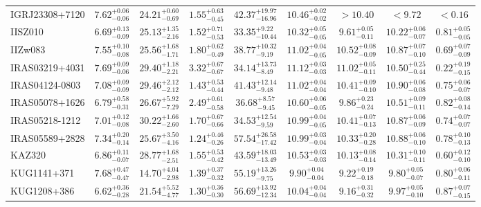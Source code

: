 \documentclass[onecolumn]{mn2e}
\begin{document}
{\begin{center}
\begin{longtable}{lcccccccc}
IGRJ23308+7120 & $7.62_{-0.06}^{+0.06}$ & $24.21_{-0.69}^{+0.60}$ & $1.55_{-0.45}^{+0.63}$ &$42.37_{-16.96}^{+19.97}$ & $10.46_{-0.02}^{+0.02}$ & $>10.40$ & $<9.72$ & $<0.16$ \\
IISZ010 & $6.69_{-0.09}^{+0.13}$ & $25.13_{-2.16}^{+1.35}$ & $1.52_{-0.53}^{+0.71}$ &$33.35_{-10.44}^{+9.22}$ & $10.32_{-0.05}^{+0.05}$ & $9.61_{-0.11}^{+0.05}$ & $10.22_{-0.07}^{+0.06}$ & $0.81_{-0.05}^{+0.05}$ \\
IIZw083 & $7.55_{-0.08}^{+0.10}$ & $25.56_{-1.71}^{+1.68}$ & $1.80_{-0.49}^{+0.62}$ &$38.77_{-9.19}^{+10.32}$ & $11.02_{-0.05}^{+0.04}$ & $10.52_{-0.09}^{+0.08}$ & $10.87_{-0.10}^{+0.07}$ & $0.69_{-0.09}^{+0.07}$ \\
IRAS03219+4031 & $7.69_{-0.06}^{+0.09}$ & $29.40_{-2.21}^{+1.18}$ & $3.32_{-0.67}^{+0.67}$ &$34.14_{-8.49}^{+13.73}$ & $11.12_{-0.03}^{+0.03}$ & $11.02_{-0.11}^{+0.05}$ & $10.50_{-0.44}^{+0.25}$ & $0.22_{-0.15}^{+0.19}$ \\
IRAS04124-0803 & $7.08_{-0.09}^{+0.09}$ & $29.46_{-2.12}^{+2.12}$ & $1.43_{-0.44}^{+0.53}$ &$41.43_{-9.48}^{+12.14}$ & $11.02_{-0.04}^{+0.04}$ & $10.41_{-0.10}^{+0.09}$ & $10.90_{-0.08}^{+0.06}$ & $0.75_{-0.07}^{+0.06}$ \\
IRAS05078+1626 & $6.79_{-0.31}^{+0.58}$ & $26.67_{-7.29}^{+5.92}$ & $2.49_{-0.58}^{+0.61}$ &$36.68_{-9.45}^{+8.57}$ & $10.60_{-0.05}^{+0.06}$ & $9.86_{-0.24}^{+0.23}$ & $10.51_{-0.11}^{+0.09}$ & $0.82_{-0.14}^{+0.08}$ \\
IRAS05218-1212 & $7.01_{-0.08}^{+0.12}$ & $30.22_{-2.60}^{+1.66}$ & $1.70_{-0.66}^{+0.67}$ &$34.53_{-9.59}^{+12.54}$ & $10.99_{-0.05}^{+0.04}$ & $10.41_{-0.13}^{+0.07}$ & $10.87_{-0.09}^{+0.06}$ & $0.74_{-0.07}^{+0.07}$ \\
IRAS05589+2828 & $7.34_{-0.14}^{+0.20}$ & $25.67_{-4.16}^{+3.50}$ & $1.24_{-0.26}^{+0.46}$ &$57.54_{-17.42}^{+26.58}$ & $10.99_{-0.04}^{+0.03}$ & $10.33_{-0.28}^{+0.20}$ & $10.88_{-0.10}^{+0.06}$ & $0.78_{-0.13}^{+0.10}$ \\
KAZ320 & $6.86_{-0.07}^{+0.11}$ & $28.77_{-2.51}^{+1.68}$ & $1.55_{-0.42}^{+0.53}$ &$43.59_{-13.49}^{+18.03}$ & $10.53_{-0.03}^{+0.03}$ & $10.13_{-0.14}^{+0.08}$ & $10.31_{-0.11}^{+0.10}$ & $0.60_{-0.10}^{+0.12}$ \\
KUG1141+371 & $7.68_{-0.47}^{+0.47}$ & $14.70_{-2.98}^{+4.04}$ & $1.39_{-0.32}^{+0.37}$ &$55.19_{-9.75}^{+13.26}$ & $9.90_{-0.04}^{+0.04}$ & $9.22_{-0.18}^{+0.19}$ & $9.80_{-0.07}^{+0.05}$ & $0.80_{-0.11}^{+0.06}$ \\
KUG1208+386 & $6.62_{-0.28}^{+0.36}$ & $21.54_{-4.77}^{+5.52}$ & $1.30_{-0.30}^{+0.36}$ &$56.69_{-12.34}^{+13.92}$ & $10.04_{-0.04}^{+0.04}$ & $9.16_{-0.32}^{+0.31}$ & $9.97_{-0.10}^{+0.05}$ & $0.87_{-0.15}^{+0.07}$ \\

\end{longtable}
\end{center}}
\end{document}
